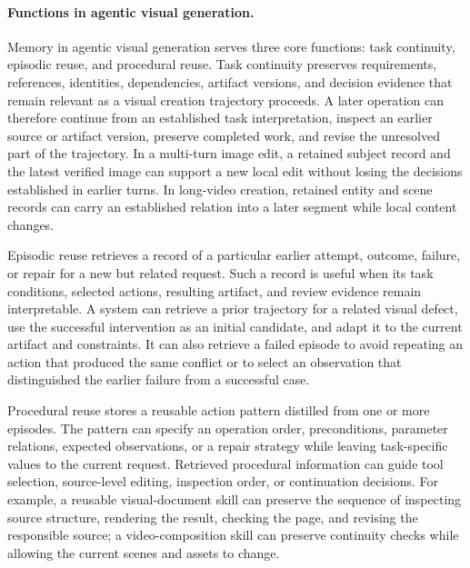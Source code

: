 \paragraph{Functions in agentic visual generation.}
Memory in agentic visual generation serves three core functions: task continuity, episodic reuse, and procedural reuse. Task continuity preserves requirements, references, identities, dependencies, artifact versions, and decision evidence that remain relevant as a visual creation trajectory proceeds. A later operation can therefore continue from an established task interpretation, inspect an earlier source or artifact version, preserve completed work, and revise the unresolved part of the trajectory. In a multi-turn image edit, a retained subject record and the latest verified image can support a new local edit without losing the decisions established in earlier turns. In long-video creation, retained entity and scene records can carry an established relation into a later segment while local content changes.

Episodic reuse retrieves a record of a particular earlier attempt, outcome, failure, or repair for a new but related request. Such a record is useful when its task conditions, selected actions, resulting artifact, and review evidence remain interpretable. A system can retrieve a prior trajectory for a related visual defect, use the successful intervention as an initial candidate, and adapt it to the current artifact and constraints. It can also retrieve a failed episode to avoid repeating an action that produced the same conflict or to select an observation that distinguished the earlier failure from a successful case.

Procedural reuse stores a reusable action pattern distilled from one or more episodes. The pattern can specify an operation order, preconditions, parameter relations, expected observations, or a repair strategy while leaving task-specific values to the current request. Retrieved procedural information can guide tool selection, source-level editing, inspection order, or continuation decisions. For example, a reusable visual-document skill can preserve the sequence of inspecting source structure, rendering the result, checking the page, and revising the responsible source; a video-composition skill can preserve continuity checks while allowing the current scenes and assets to change.

